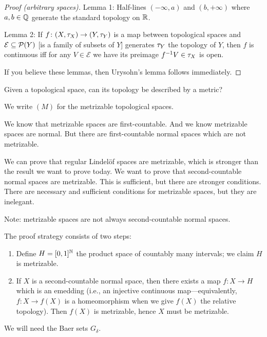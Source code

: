 \begin{proof}[Proof (arbitrary spaces)]
Lemma 1: Half-lines $(-\infty, a)$ and $(b,+\infty)$ where $a,b\in\mathbb{Q}$
generate the standard topology on $\mathbb{R}$.

Lemma 2: If $f\colon(X,\tau_{X})\to(Y,\tau_{Y})$ is a map
between topological spaces and $\mathcal{E}\subseteq\mathcal{P}(Y)$ [is a
  family of subsets of $Y$] generates $\tau_{Y}$ the topology of
$Y$, then $f$ is continuous iff for any $V\in\mathcal{E}$ we have its preimage
$f^{-1}V\in\tau_{X}$ is open.

If you believe these lemmas, then Urysohn's lemma follows immediately.
\end{proof}

\begin{problem}
Given a topological space, can its topology be described by a metric?
\end{problem}

\begin{notation}
We write $(M)$ for the metrizable topological spaces.
\end{notation}

\begin{node}
We know that metrizable spaces are first-countable. And we know
metrizable spaces are normal. But there are first-countable normal
spaces which are not metrizable.
\end{node}

\begin{node}
We can prove that regular Lindel\"{o}f spaces are metrizable, which is
stronger than the result we want to prove today. We want to prove that
second-countable normal spaces are metrizable. This is sufficient, but
there are stronger conditions. There are necessary and sufficient
conditions for metrizable spaces, but they are inelegant.

Note: metrizable spaces are not always second-countable normal spaces.
\end{node}

\begin{node}[Strategy] The proof strategy consists of two steps:
\begin{enumerate}
\item Define  $H=[0,1]^{\mathbb{N}}$ the product space
  of countably many intervals; we claim $H$ is metrizable.
\item If $X$ is a second-countable normal space, then there exists a
  map $f\colon X\to H$ which is an emedding (i.e., an injective
  continuous map---equivalently, $f\colon X\to f(X)$ is a
  homeomorphism when we give $f(X)$ the relative topology). Then
  $f(X)$ is metrizable, hence $X$ must be metrizable.
\end{enumerate}
We will need the Baer sets $G_{\delta}$.
\end{node}

